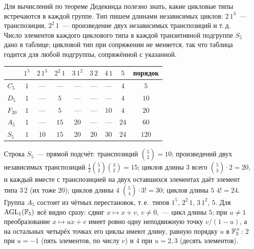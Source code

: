 \begin{center}
\begin{keepfig}
\centering
{}
\end{keepfig}
\end{center}

Для вычислений по теореме Дедекинда полезно знать, какие цикловые типы встречаются в каждой группе. Тип пишем
длинами независимых циклов: $2\,1^3$~--- транспозиция, $2^2\,1$~--- произведение двух независимых транспозиций и т.\,д.
Число элементов каждого циклового типа в каждой транзитивной подгруппе $S_5$ дано в таблице; цикловой тип при
сопряжении не меняется, так что таблица годится для любой подгруппы, сопряжённой с указанной.
\begin{center}
\small
\begin{tabular}{@{}lcccccccc@{}}
\toprule
 & $1^5$ & $2\,1^3$ & $2^2\,1$ & $3\,1^2$ & $3\,2$ & $4\,1$ & $5$ & порядок\\
\midrule
$C_5$ & $1$ & --- & --- & --- & --- & --- & $4$ & $5$\\
$D_5$ & $1$ & --- & $5$ & --- & --- & --- & $4$ & $10$\\
$F_{20}$ & $1$ & --- & $5$ & --- & --- & $10$ & $4$ & $20$\\
$A_5$ & $1$ & --- & $15$ & $20$ & --- & --- & $24$ & $60$\\
$S_5$ & $1$ & $10$ & $15$ & $20$ & $20$ & $30$ & $24$ & $120$\\
\bottomrule
\end{tabular}
\end{center}
Строка $S_5$~--- прямой подсчёт: транспозиций $\binom52=10$; произведений двух независимых транспозиций $\frac12\binom52\binom32=15$;
циклов длины $3$ всего $\binom53\cdot2=20$, и каждый вместе с транспозицией на двух оставшихся элементах даёт элемент
типа $3\,2$ (их тоже $20$); циклов длины $4$ $\binom54\cdot3!=30$; циклов длины $5$ $4!=24$. Группа $A_5$ состоит из чётных
перестановок, т.\,е.\ типов $1^5$, $2^2\,1$, $3\,1^2$, $5$. Для $\mathrm{AGL}_1(\mathbb F_5)$ всё видно сразу: сдвиг $x\mapsto x+v$, $v\ne0$,~---
цикл длины $5$; при $u\ne1$ преобразование $x\mapsto ux+v$ имеет ровно одну неподвижную точку $v/(1-u)$, а на остальных
четырёх точках его циклы имеют длину, равную порядку $u$ в $\mathbb F_5^\times$: $2$ при $u=-1$ (пять элементов, по числу $v$) и
$4$ при $u=2,3$ (десять элементов).

